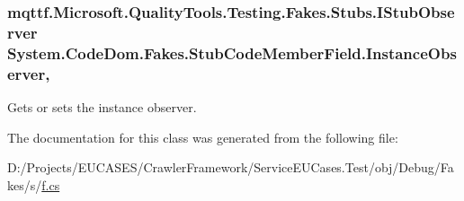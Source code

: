 \hypertarget{class_system_1_1_code_dom_1_1_fakes_1_1_stub_code_member_field_ac1d65afda15e7b54bf0f52475c367019}{
\subsubsection[{Instance\-Observer}]{\setlength{\rightskip}{0pt plus 5cm}mqttf.\-Microsoft.\-Quality\-Tools.\-Testing.\-Fakes.\-Stubs.\-I\-Stub\-Observer System.\-Code\-Dom.\-Fakes.\-Stub\-Code\-Member\-Field.\-Instance\-Observer\hspace{0.3cm}{\ttfamily [get]}, {\ttfamily [set]}}}\label{class_system_1_1_code_dom_1_1_fakes_1_1_stub_code_member_field_ac1d65afda15e7b54bf0f52475c367019}


Gets or sets the instance observer.



The documentation for this class was generated from the following file\-:\begin{DoxyCompactItemize}
\item 
D\-:/\-Projects/\-E\-U\-C\-A\-S\-E\-S/\-Crawler\-Framework/\-Service\-E\-U\-Cases.\-Test/obj/\-Debug/\-Fakes/s/\hyperlink{s_2f_8cs}{f.\-cs}\end{DoxyCompactItemize}
